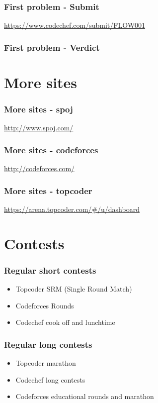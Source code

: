 \begin{frame}
    \frametitle{First problem - Submit}
    \href{https://www.codechef.com/submit/FLOW001}{https://www.codechef.com/submit/FLOW001}
\end{frame}

\begin{frame}
    \frametitle{First problem - Verdict}
\end{frame}

\section{More sites}
\begin{frame}
    \frametitle{More sites - spoj}
    \href{http://www.spoj.com/}{http://www.spoj.com/}
\end{frame}

\begin{frame}
    \frametitle{More sites - codeforces}
    \href{http://codeforces.com/}{http://codeforces.com/}
\end{frame}

\begin{frame}
    \frametitle{More sites - topcoder}
    \href{https://arena.topcoder.com/#/u/dashboard}{https://arena.topcoder.com/#/u/dashboard}
\end{frame}

\section{Contests}
\begin{frame}
    \frametitle{Regular short contests}
    \begin{itemize}
        \item Topcoder SRM (Single Round Match) \\
        \item Codeforces Rounds \\
        \item Codechef cook off and lunchtime \\
    \end{itemize}
\end{frame}

\begin{frame}
    \frametitle{Regular long contests}
    \begin{itemize}
        \item Topcoder marathon \\
        \item Codechef long contests \\
        \item Codeforces educational rounds and marathon \\
    \end{itemize}
\end{frame}

